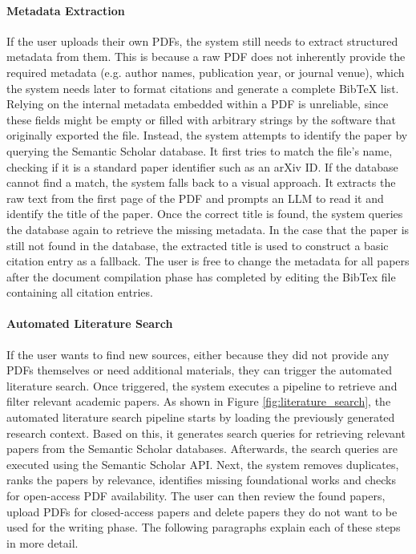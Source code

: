 \paragraph{Metadata Extraction}
If the user uploads their own PDFs, the system still needs to extract structured metadata from them. 
This is because a raw PDF does not inherently provide the required metadata (e.g. author names, publication year, or journal venue), which the system needs later to format citations and generate a complete BibTeX list.
Relying on the internal metadata embedded within a PDF is unreliable, since these fields might be empty or filled with arbitrary strings by the software that originally exported the file.
Instead, the system attempts to identify the paper by querying the Semantic Scholar database. 
It first tries to match the file's name, checking if it is a standard paper identifier such as an arXiv ID.
If the database cannot find a match, the system falls back to a visual approach. 
It extracts the raw text from the first page of the PDF and prompts an LLM to read it and identify the title of the paper. 
Once the correct title is found, the system queries the database again to retrieve the missing metadata. 
In the case that the paper is still not found in the database, the extracted title is used to construct a basic citation entry as a fallback.
The user is free to change the metadata for all papers after the document compilation phase has completed by editing the BibTex file containing all citation entries.

\paragraph{Automated Literature Search}
If the user wants to find new sources, either because they did not provide any PDFs themselves or need additional materials, they can trigger the automated literature search. 
Once triggered, the system executes a pipeline to retrieve and filter relevant academic papers.
As shown in Figure \ref{fig:literature_search}, the automated literature search pipeline starts by loading the previously generated research context.
Based on this, it generates search queries for retrieving relevant papers from the Semantic Scholar databases.
Afterwards, the search queries are executed using the Semantic Scholar API.
Next, the system removes duplicates, ranks the papers by relevance, identifies missing foundational works and checks for open-access PDF availability.
The user can then review the found papers, upload PDFs for closed-access papers and delete papers they do not want to be used for the writing phase. 
The following paragraphs explain each of these steps in more detail.

